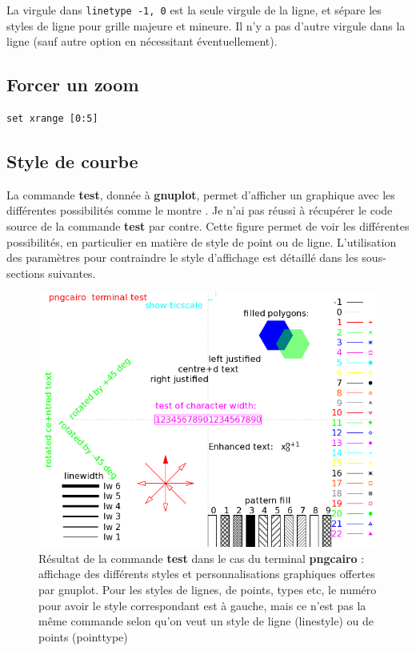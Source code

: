 \documentclass[a4paper,twoside]{article}
\begin{document}
\begin{attention}
La virgule dans \texttt{linetype -1, 0} est la seule virgule de la ligne, et sépare les styles de ligne pour grille majeure et mineure. Il n'y a pas d'autre virgule dans la ligne (sauf autre option en nécessitant éventuellement).
\end{attention}




\subsection{Forcer un zoom}
\begin{verbatim}
set xrange [0:5]
\end{verbatim}

\subsection{Style de courbe}
La commande \textbf{test}, donnée à \textbf{gnuplot}, permet d'afficher un graphique avec les différentes possibilités comme le montre . Je n'ai pas réussi à récupérer le code source de la commande \textbf{test} par contre. Cette figure permet de voir les différentes possibilités, en particulier en matière de style de point ou de ligne. L'utilisation des paramètres pour contraindre le style d'affichage est détaillé dans les sous-sections suivantes.

\begin{figure}[htb]
\centering
\includegraphics[width=0.65\linewidth]{figures/test_styles.png}
\caption{Résultat de la commande \textbf{test} dans le cas du terminal \textbf{pngcairo} : affichage des différents styles et personnalisations graphiques offertes par gnuplot. Pour les styles de lignes, de points, types etc, le numéro pour avoir le style correspondant est à gauche, mais ce n'est pas la même commande selon qu'on veut un style de ligne (linestyle) ou de points (pointtype)}\label{fig:styles}
\end{figure}
\end{document}
